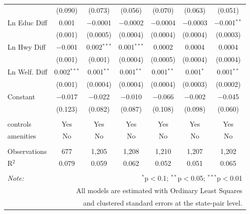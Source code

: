 \begin{table}[!htbp]
\begin{tabular}{@{\extracolsep{5pt}}lcccccc}
  & (0.090) & (0.073) & (0.056) & (0.070) & (0.063) & (0.051) \\ 
  Ln Educ Diff & 0.001 & $-$0.0001 & $-$0.0002 & $-$0.0004 & $-$0.0003 & $-$0.001$^{**}$ \\ 
  & (0.001) & (0.0005) & (0.0004) & (0.0004) & (0.0004) & (0.0003) \\ 
  Ln Hwy Diff & $-$0.001 & 0.002$^{***}$ & 0.001$^{***}$ & 0.0002 & 0.0004 & 0.0004 \\ 
  & (0.001) & (0.001) & (0.0004) & (0.0005) & (0.0004) & (0.0004) \\ 
  Ln Welf. Diff & 0.002$^{***}$ & 0.001$^{**}$ & 0.001$^{**}$ & 0.001$^{**}$ & 0.001$^{*}$ & 0.001$^{**}$ \\ 
  & (0.001) & (0.0004) & (0.0004) & (0.0004) & (0.0003) & (0.0002) \\ 
  Constant & $-$0.017 & $-$0.022 & $-$0.010 & $-$0.066 & $-$0.002 & $-$0.045 \\ 
  & (0.123) & (0.082) & (0.087) & (0.108) & (0.098) & (0.060) \\ 
 \hline \\[-1.8ex] 
controls & Yes & Yes & Yes & Yes & Yes & Yes \\ 
amenities & No & No & No & No & No & No \\ 
\hline \\[-1.8ex] 
Observations & 677 & 1,205 & 1,208 & 1,210 & 1,207 & 1,202 \\ 
R$^{2}$ & 0.079 & 0.059 & 0.062 & 0.052 & 0.051 & 0.065 \\ 
\hline 
\hline \\[-1.8ex] 
\textit{Note:}  & \multicolumn{6}{r}{$^{*}$p$<$0.1; $^{**}$p$<$0.05; $^{***}$p$<$0.01} \\ 
 & \multicolumn{6}{r}{All models are estimated with Ordinary Least Squares} \\ 
 & \multicolumn{6}{r}{and clustered standard errors at the state-pair level.} \\ 
\end{tabular} 
\end{table} 
